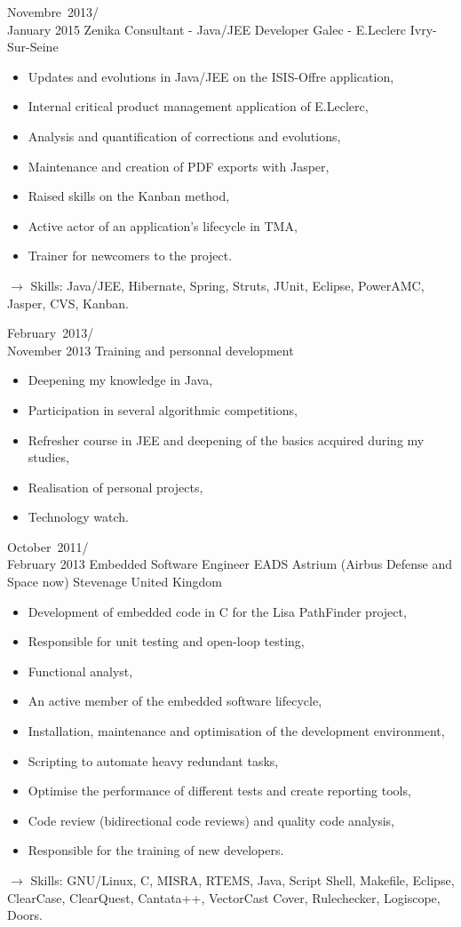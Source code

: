 \documentclass[11pt,a4paper]{moderncv}
\begin{document}
\cventry
{Novembre\ 2013/\\January 2015}
{Zenika Consultant - Java/JEE Developer}
{Galec - E.Leclerc}
{Ivry-Sur-Seine}
{}
{\begin{itemize}
\item Updates and evolutions in Java/JEE on the ISIS-Offre application,
\item Internal critical product management application of E.Leclerc,
\item Analysis and quantification of corrections and evolutions,
\item Maintenance and creation of PDF exports with Jasper,
\item Raised skills on the Kanban method,
\item Active actor of an application's lifecycle in TMA,
\item Trainer for newcomers to the project.
\end{itemize}
$\rightarrow$ Skills: Java/JEE, Hibernate, Spring, Struts, JUnit, Eclipse, PowerAMC, Jasper, CVS, Kanban.
}   %

\cventry
{February\ 2013/\\November 2013}
{Training and personnal development}{}{}{}
{\begin{itemize}
\item Deepening my knowledge in Java,
\item Participation in several algorithmic competitions,
\item Refresher course in JEE and deepening of the basics acquired during my studies,
\item Realisation of personal projects,
\item Technology watch.
\end{itemize}
}   %

\cventry
{October\ 2011/\\February 2013}
{Embedded Software Engineer}
{EADS Astrium (Airbus Defense and Space now)}
{Stevenage United Kingdom}
{}
{\begin{itemize}
\item Development of embedded code in C for the Lisa PathFinder project,
\item Responsible for unit testing and open-loop testing,
\item Functional analyst,
\item An active member of the embedded software lifecycle,
\item Installation, maintenance and optimisation of the development environment,
\item Scripting to automate heavy redundant tasks,
\item Optimise the performance of different tests and create reporting tools,
\item Code review (bidirectional code reviews) and quality code analysis,
\item Responsible for the training of new developers.
\end{itemize}
$\rightarrow$ Skills: GNU/Linux, C, MISRA, RTEMS, Java, Script Shell, Makefile, Eclipse, ClearCase, ClearQuest, Cantata++, VectorCast Cover, Rulechecker, Logiscope, Doors.
}   %
\end{document}
